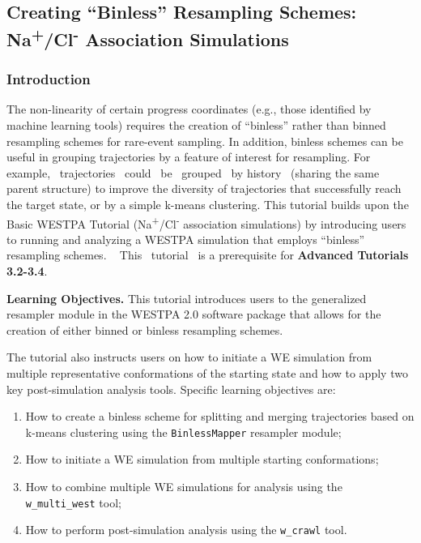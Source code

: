 \subsection{Creating “Binless” Resampling Schemes: Na\textsuperscript{+}/Cl\textsuperscript{-} Association Simulations}


\subsubsection{Introduction}
The non-linearity of certain progress coordinates (e.g., those identified by machine learning tools) requires the creation of “binless” rather than binned resampling schemes for rare-event sampling. 
In addition, binless schemes can be useful in grouping trajectories by a feature of interest for resampling. 
For example,~ trajectories~ could~ be~ grouped~ by history~ (sharing the same parent structure) to improve the diversity of trajectories that successfully reach the target state, or by a simple k-means clustering. 
This tutorial builds upon the Basic WESTPA Tutorial (Na\textsuperscript{+}/Cl\textsuperscript{-} association simulations) \citep{bogetti_suite_2019} by introducing users to running and analyzing a WESTPA simulation that employs “binless” resampling schemes.
~ This~ tutorial~ is a prerequisite for \textbf{Advanced Tutorials 3.2-3.4}. 

\textbf{Learning Objectives.} This tutorial introduces users to the generalized resampler module in the WESTPA 2.0 software package that allows for the creation of either binned or binless resampling schemes.

The tutorial also instructs users on how to initiate a WE simulation from multiple representative conformations of the starting state and how to apply two key post-simulation analysis tools. 
Specific learning objectives are:
\begin{enumerate}
    \item How to create a binless scheme for splitting and merging trajectories based on k-means clustering using the \verb|BinlessMapper| resampler module;
    \item How to initiate a WE simulation from multiple starting conformations;
    \item How to combine multiple WE simulations for analysis using the \verb|w_multi_west| tool;
    \item How to perform post-simulation analysis using the \verb|w_crawl| tool.
\end{enumerate}

